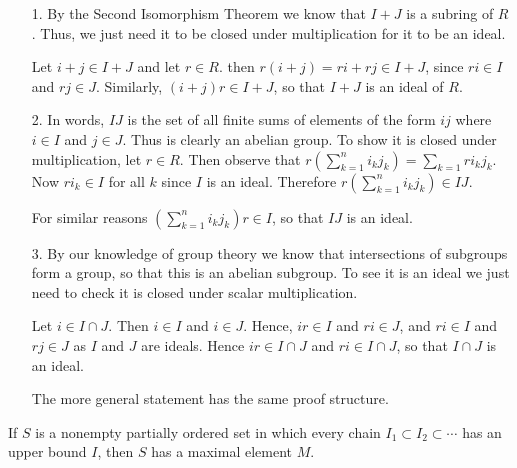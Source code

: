     \begin{prf}
        \begin{itemize}
            \item[1.] 
            By the Second Isomorphism Theorem we know that $I + J$
            is a subring of $R$. Thus, we just need it to be
            closed under multiplication for it to be an ideal. 

            Let $i + j \in I + J$ and let $r \in R$.
            then $r(i + j) = ri +rj \in I + J$, since $ri \in I$
            and $rj \in J$. Similarly, $(i + j)r \in I + J$, so
            that $I + J$ is an ideal of $R$.

            \item[2.] In words, $IJ$ is the set of all finite sums
            of elements of the form $ij$ where $i \in I$ and $j
            \in J$. Thus is clearly an abelian group. To show it
            is closed under multiplication, let $r \in R$. Then
            observe that $r(\sum_{k=1}^{n}i_kj_k) =
            \sum_{k=1}ri_kj_k$. 
            Now $ri_k \in I$ for all $k$ since $I$ is an ideal.
            Therefore $r(\sum_{k=1}^{n}i_kj_k) \in IJ$. 

            For similar reasons $(\sum_{k=1}^{n}i_kj_k)r \in I$,
            so that $IJ$ is an ideal. 

            \item[3.] By our knowledge of
            group theory we know that intersections of subgroups
            form a group, so that this is an abelian subgroup.
            To see it is an ideal we just need to check it is
            closed under scalar multiplication. 

            Let $i \in I \cap J$. Then $i \in I$ and $i \in J$.
            Hence, $ir \in I$ and $ri \in J$, and $ri \in I$ and
            $rj \in J$ as $I$ and $J$ are ideals. Hence $ir \in I
            \cap J$ and $ri \in I \cap J$, so that $I \cap J$ is
            an ideal. 

            The more general statement has the same proof structure.
        \end{itemize}
    \end{prf}


    \begin{lemma}
    If $S$ is a nonempty
    partially ordered set in which every chain $I_1 \subset I_2
    \subset \cdots$ has an upper bound $I$, then $S$ has a maximal
    element $M$.
    \end{lemma}

